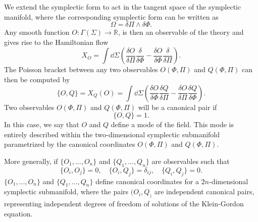 \documentclass[letterpaper,12pt,titlepage,oneside,final]{book}
\begin{document}
We extend the symplectic form to act in the tangent space of the symplectic manifold, where the corresponding symplectic form can be written as
\begin{equation}
    \Omega = \delta\Pi\wedge \delta \Phi.
\end{equation}
Any smooth function $O:\Gamma(\Sigma)\longrightarrow \mathbb{R}$, is then an observable of the theory and gives rise to the Hamiltonian flow
\begin{equation}
    X_O = \int \dd \Sigma \left(\frac{\delta O}{\delta \Pi} \frac{\delta}{\delta \Phi} - \frac{\delta O}{\delta \Phi}\frac{\delta}{\delta \Pi}\right).
\end{equation}
The Poisson bracket between any two observables $O(\Phi,\Pi)$ and $Q(\Phi,\Pi)$ can then be computed by
\begin{equation}
    \{O,Q\} = X_{Q}(O) = \int \dd \Sigma \left(\frac{\delta O}{\delta \Phi}\frac{\delta Q}{\delta \Pi} - \frac{\delta O}{\delta \Pi} \frac{\delta Q}{\delta \Phi}\right).
\end{equation}
Two observables $O(\Phi,\Pi)$ and $Q(\Phi,\Pi)$ will be a canonical pair if
\begin{equation}
    \{O,Q\} = 1.
\end{equation}
In this case, we say that $O$ and $Q$ define a mode of the field. This mode is entirely described within the two-dimensional symplectic submanifold parametrized by the canonical coordinates $O(\Phi,\Pi)$ and $Q(\Phi,\Pi)$. 

More generally, if $\{O_1,...,O_n\}$ and $\{Q_1,...,Q_n\}$ are observables such that
\begin{equation}
    \{O_i,O_j\} = 0, \quad \{O_i,Q_j\} = \delta_{ij}, \quad \{Q_i,Q_j\} = 0.
\end{equation}
$\{O_1,...,O_n\}$ and $\{Q_1,...,Q_n\}$ define canonical coordinates for a $2n$-dimensional symplectic submanifold, where the pairs $(O_i,Q_)$ are independent canonical pairs, representing independent degrees of freedom of solutions of the Klein-Gordon equation.
\end{document}
